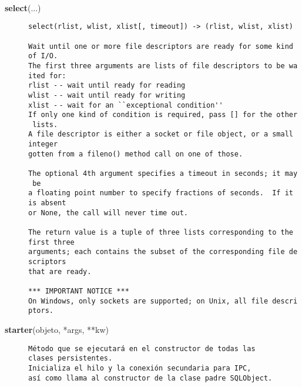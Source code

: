 {\tt ~~~~~~}~
\begin{description}\item[{\bf select}(...)]{\tt select(rlist,~wlist,~xlist[,~timeout])~->~(rlist,~wlist,~xlist)\\
~\\
Wait~until~one~or~more~file~descriptors~are~ready~for~some~kind~of~I/O.\\
The~first~three~arguments~are~lists~of~file~descriptors~to~be~waited~for:\\
rlist~-$\,$-~wait~until~ready~for~reading\\
wlist~-$\,$-~wait~until~ready~for~writing\\
xlist~-$\,$-~wait~for~an~\verb|``|exceptional~condition\verb|''|\\
If~only~one~kind~of~condition~is~required,~pass~[]~for~the~other~lists.\\
A~file~descriptor~is~either~a~socket~or~file~object,~or~a~small~integer\\
gotten~from~a~fileno()~method~call~on~one~of~those.\\
~\\
The~optional~4th~argument~specifies~a~timeout~in~seconds;~it~may~be\\
a~floating~point~number~to~specify~fractions~of~seconds.~~If~it~is~absent\\
or~None,~the~call~will~never~time~out.\\
~\\
The~return~value~is~a~tuple~of~three~lists~corresponding~to~the~first~three\\
arguments;~each~contains~the~subset~of~the~corresponding~file~descriptors\\
that~are~ready.\\
~\\
***~IMPORTANT~NOTICE~***\\
On~Windows,~only~sockets~are~supported;~on~Unix,~all~file~descriptors.}\end{description}
 \begin{description}\item[{\bf starter}(objeto, *args, **kw)]{\tt Método~que~se~ejecutará~en~el~constructor~de~todas~las~\\
clases~persistentes.\\
Inicializa~el~hilo~y~la~conexión~secundaria~para~IPC,~\\
así~como~llama~al~constructor~de~la~clase~padre~SQLObject.}\end{description}
\par 


